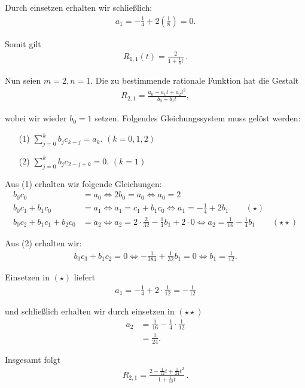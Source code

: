 \documentclass[10pt]{article}
\begin{document}
    Durch einsetzen erhalten wir schließlich:
    \begin{align*}
      a_1 = -\frac{1}{4} + 2\left(\frac{1}{8}\right) = 0.
    \end{align*}

    Somit gilt 
    \begin{align*}
      R_{1,1}(t) = \frac{2}{1+\frac{1}{8}t}\,.
    \end{align*}

    Nun seien $m=2, n=1$. Die zu bestimmende rationale Funktion hat die Gestalt
    \begin{align*}
      R_{2,1} = \frac{a_0 + a_1t + a_2t^2}{b_0 + b_1t},
    \end{align*}

    wobei wir wieder $b_0 = 1$ setzen. Folgendes Gleichungssystem muss gelöst werden:
    \begin{enumerate}
      \item[(1)] $\sum_{j=0}^{k} b_j c_{k-j} = a_k$. \quad $(k = 0,1,2)$
      \item[(2)] $\sum_{j=0}^{k} b_j c_{2-j+k} = 0$. \quad $(k = 1)$
    \end{enumerate}

    Aus (1) erhalten wir folgende Gleichungen:
    \begin{align*}
      b_0c_0 &= a_0 \iff 2b_0 = a_0 \iff a_0 = 2   \\
      b_0c_1 + b_1c_0 &= a_1 \iff a_1 = c_1 + b_1c_0 \iff a_1 = -\frac{1}{4} + 2b_1 \qquad (\star) \\
      b_0c_2 + b_1c_1 + b_2c_0 &= a_2 \iff a_2 = 2\cdot \frac{2}{32} - \frac{1}{4}b_1 + 2\cdot 0
                                      \iff a_2 = \frac{1}{16} - \frac{1}{4}b_1 \qquad (\star\star)
    \end{align*}

    Aus (2) erhalten wir:
    \begin{align*}
      b_0c_3 + b_1c_2 = 0 \iff -\frac{1}{384} + \frac{1}{32}b_1 = 0 \iff b_1 = \frac{1}{12}.
    \end{align*}

    Einsetzen in $(\star)$ liefert 
    \begin{align*}
      a_1 = -\frac{1}{4} + 2\cdot \frac{1}{12} = -\frac{1}{12}
    \end{align*}

    und schließlich erhalten wir durch einsetzen in $(\star\star)$
    \begin{align*}
      a_2 &= \frac{1}{16} - \frac{1}{4}\cdot \frac{1}{12}  \\
          &= \frac{1}{24}.
    \end{align*}

    Insgesamt folgt
    \begin{align*}
      R_{2,1} = \frac{2 - \frac{1}{12}t + \frac{1}{24}t^2}{1 + \frac{1}{12}t}\,.
    \end{align*}
\end{document}
